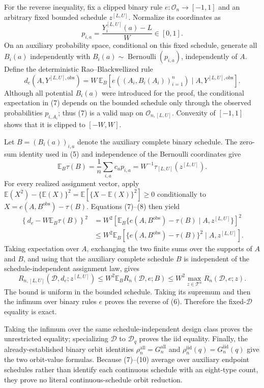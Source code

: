 For the reverse inequality, fix a clipped binary rule \(e:\mathcal O_n\to[-1,1]\) and an arbitrary fixed bounded schedule \(z^{[L,U]}\).  Normalize its coordinates as
\[
p_{i,a}=\frac{Y_i^{[L,U]}(a)-L}{W}\in[0,1].
\]
On an auxiliary probability space, conditional on this fixed schedule, generate all
\(B_i(a)\) independently with \(B_i(a)\sim\operatorname{Bernoulli}(p_{i,a})\), independently of \(A\).  Define the deterministic Rao--Blackwellized rule
\[
d_e(A,Y^{[L,U],\mathrm{obs}})
=W\,\mathbb E_B\!\left[
e((A_i,B_i(A_i))_{i=1}^n)\mid A,Y^{[L,U],\mathrm{obs}}
\right].
\tag{7}
\]
Although all potential \(B_i(a)\) were introduced for the proof, the conditional expectation in (7) depends on the bounded schedule only through the observed probabilities \(p_{i,A_i}\); thus (7) is a valid map on \(\mathcal O_{n,[L,U]}\).  Convexity of \([-1,1]\) shows that it is clipped to \([-W,W]\).

Let \(B=(B_i(a))_{i,a}\) denote the auxiliary complete binary schedule.  The zero-sum identity used in (5) and independence of the Bernoulli coordinates give
\[
\mathbb E_B\tau(B)
=\frac1n\sum_{i,a}c_ap_{i,a}
=W^{-1}\tau_{[L,U]}(z^{[L,U]}).
\tag{8}
\]
For every realized assignment vector, apply
\(\mathbb E(X^2)-\{\mathbb E(X)\}^2
=\mathbb E[\{X-\mathbb E(X)\}^2]\geq0\)
conditionally to
\(X=e(A,B^{\mathrm{obs}})-\tau(B)\).  Equations (7)--(8) then yield
\[
\begin{aligned}
\left\{d_e-W\mathbb E_B\tau(B)\right\}^2
&=W^2\left[
\mathbb E_B\{e(A,B^{\mathrm{obs}})-\tau(B)\mid A,z^{[L,U]}\}
\right]^2\\
&\leq W^2\mathbb E_B\!\left[
\{e(A,B^{\mathrm{obs}})-\tau(B)\}^2\mid A,z^{[L,U]}
\right].
\end{aligned}
\tag{9}
\]
Taking expectation over \(A\), exchanging the two finite sums over the supports of \(A\) and \(B\), and using that the auxiliary complete schedule \(B\) is independent of the schedule-independent assignment law, gives
\[
R_{n,[L,U]}(\mathcal D,d_e;z^{[L,U]})
\leq W^2\mathbb E_B R_n(\mathcal D,e;B)
\leq W^2\max_{z\in\mathcal T^n}R_n(\mathcal D,e;z).
\tag{10}
\]
The bound is uniform in the bounded schedule.  Taking its supremum and then the infimum over binary rules \(e\) proves the reverse of (6).  Therefore the fixed-\(\mathcal D\) equality is exact.

Taking the infimum over the same schedule-independent design class proves the unrestricted equality; specializing \(\mathcal D\) to \(\mathcal D_q\) proves the iid equality.  Finally, the already-established binary orbit identities
\(\rho_n^{\mathrm{all}}=G_n^{\mathrm{all}}\) and
\(\rho_n^{\mathrm{iid}}(q)=G_n^{\mathrm{iid}}(q)\) give the two orbit-value formulas.  Because (7)--(10) average over auxiliary endpoint schedules rather than identify each continuous schedule with an eight-type count, they prove no literal continuous-schedule orbit reduction.

